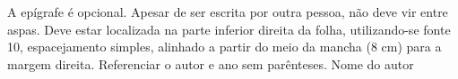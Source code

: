 \begin{epigrafe}
	\vspace*{\fill}
    \begin{quoting}[rightmargin=0cm,leftmargin=8cm]
        \noindent A epígrafe é opcional. Apesar de ser escrita por outra pessoa, não deve vir entre aspas. Deve estar localizada na parte inferior direita da folha, utilizando-se fonte 10, espacejamento simples, alinhado a partir do meio da mancha (8 cm) para a margem direita. Referenciar o autor e ano sem parênteses.
		\newline
		\newline
		Nome do autor
    \end{quoting}
\end{epigrafe}